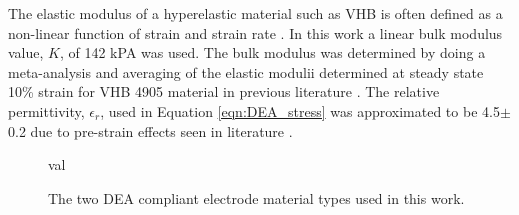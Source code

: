 The elastic modulus of a hyperelastic material such as VHB is often defined as a non-linear function of strain and strain rate \cite{Liu2018} . In this work a linear bulk modulus value, $K$, of 142 kPA was used. The bulk modulus was determined by doing a meta-analysis and averaging of the elastic modulii determined at steady state 10\% strain for VHB 4905 material in previous literature \cite{Liu2018, Helal2018, Huang2023} .
The relative permittivity, $\epsilon_r$, used in Equation \ref{eqn:DEA_stress} was approximated to be 4.5$\pm$0.2 due to pre-strain effects seen in literature \cite{Kofod2003, Choi2005, Wissler2007, Pan2015} .
\begin{figure}[H]
	\centering
 val	
	\hspace{1cm}
	\vspace{0.2cm}
	\caption{The two DEA compliant electrode material types used in this work.}
	\label{fig:DEAs}
\end{figure}

